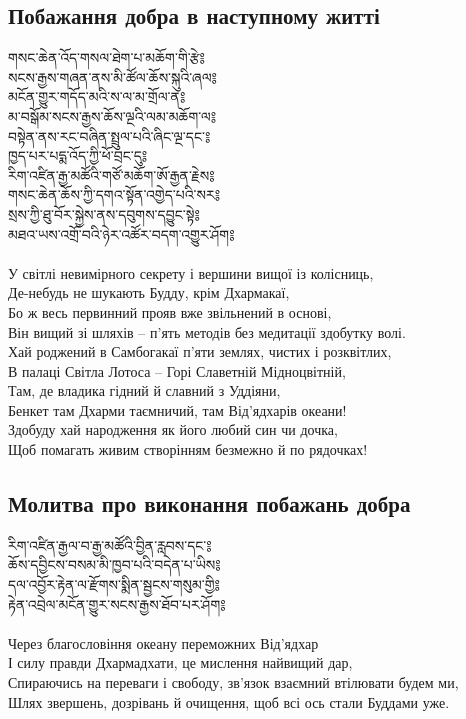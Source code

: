 \subsection{Побажання добра в наступному житті}
\vspace{0.5cm}
\ti
གསང་ཆེན་འོད་གསལ་ཐེག་པ་མཆོག་གི་རྩེ༔\\
སངས་རྒྱས་གཞན་ནས་མི་ཚོལ་ཆོས་སྐུའི་ཞལ༔\\
མངོན་གྱུར་གདོད་མའི་ས་ལ་མ་གྲོལ་ན༔\\
མ་བསྒོམ་སངས་རྒྱས་ཆོས་ལྔའི་ལམ་མཆོག་ལ༔\\
བསྟེན་ནས་རང་བཞིན་སྤྲུལ་པའི་ཞིང་ལྔ་དང་༔\\
ཁྱད་པར་པདྨ་འོད་ཀྱི་ཕོ་བྲང་དུ༔\\
རིག་འཛིན་རྒྱ་མཚོའི་གཙོ་མཆོག་ཨོ་རྒྱན་རྗེས༔\\
གསང་ཆེན་ཆོས་ཀྱི་དགའ་སྟོན་འགྱེད་པའི་སར༔\\
སྲས་ཀྱི་ཐུ་བོར་སྐྱེས་ནས་དབུགས་དབྱུང་སྟེ༔\\
མཐའ་ཡས་འགྲོ་བའི་ཉེར་འཚོར་བདག་འགྱུར་ཤོག༔\\
\\
\ru
У світлі невимірного секрету і вершини вищої із колісниць,\\
Де-небудь не шукають Будду, крім Дхармакаї,\\
Бо ж весь первинний прояв вже звільнений в основі,\\
Він вищий зі шляхів -- п'ять методів без медитації здобутку волі.\\
Хай роджений в Самбогакаї п'яти землях, чистих і розквітлих,\\
В палаці Світла Лотоса -- Горі Славетній Мідноцвітній,\\
Там, де владика гідний й славний з Уддіяни,\\
Бенкет там Дхарми таємничий, там Від'ядхарів океани!\\
Здобуду хай народження як його любий син чи дочка,\\
Щоб помагать живим створінням безмежно й по рядочках!\\

\newpage
\subsection{Молитва про виконання побажань добра}
\vspace{0.5cm}
\ti
རིག་འཛིན་རྒྱལ་བ་རྒྱ་མཚོའི་བྱིན་རླབས་དང་༔\\
ཆོས་དབྱིངས་བསམ་མི་ཁྱབ་པའི་བདེན་པ་ཡིས༔\\
དལ་འབྱོར་རྟེན་ལ་རྫོགས་སྨིན་སྦྱངས་གསུམ་གྱི༔\\
རྟེན་འབྲེལ་མངོན་གྱུར་སངས་རྒྱས་ཐོབ་པར་ཤོག༔\\
\\
\ru
Через благословіння океану переможних Від'ядхар\\
І силу правди Дхармадхати, це мислення найвищий дар,\\
Спираючись на переваги і свободу, зв'язок взаємний втілювати будем ми,\\
Шлях звершень, дозрівань й очищення, щоб всі ось стали Буддами уже.\\
